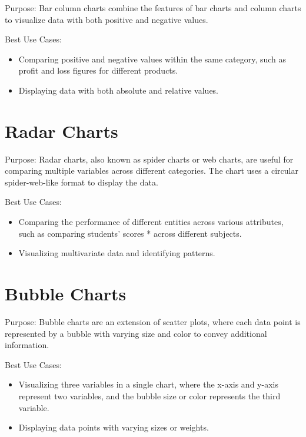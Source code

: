 \documentclass[
]{book}
\providecommand{\tightlist}{%
  \setlength{\itemsep}{0pt}\setlength{\parskip}{0pt}}
\begin{document}
Purpose: Bar column charts combine the features of bar charts and column charts to visualize data with both positive and negative values.

Best Use Cases:

\begin{itemize}
\tightlist
\item
  Comparing positive and negative values within the same category, such as profit and loss figures for different products.
\item
  Displaying data with both absolute and relative values.
\end{itemize}

\hypertarget{radar-charts}{%
\section{Radar Charts}\label{radar-charts}}

Purpose: Radar charts, also known as spider charts or web charts, are useful for comparing multiple variables across different categories. The chart uses a circular spider-web-like format to display the data.

Best Use Cases:

\begin{itemize}
\tightlist
\item
  Comparing the performance of different entities across various attributes, such as comparing students' scores * across different subjects.
\item
  Visualizing multivariate data and identifying patterns.
\end{itemize}

\hypertarget{bubble-charts}{%
\section{Bubble Charts}\label{bubble-charts}}

Purpose: Bubble charts are an extension of scatter plots, where each data point is represented by a bubble with varying size and color to convey additional information.

Best Use Cases:

\begin{itemize}
\tightlist
\item
  Visualizing three variables in a single chart, where the x-axis and y-axis represent two variables, and the bubble size or color represents the third variable.
\item
  Displaying data points with varying sizes or weights.
\end{itemize}
\end{document}
